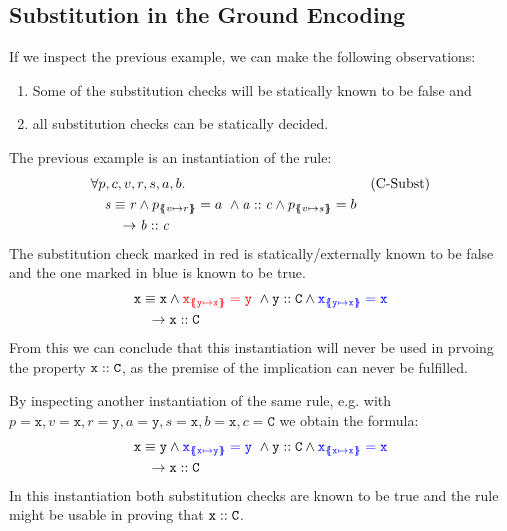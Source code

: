 \documentclass[a4paper]{article}
\begin{document}
\subsection{Substitution in the Ground Encoding}
If we inspect the previous example,
we can make the following observations:
\begin{enumerate}
  \item Some of the substitution checks will be statically known to be false and
  \item all substitution checks can be statically decided.
\end{enumerate}

The previous example is an instantiation of the rule:
\begin{align*}
  &\forall p, c, v, r, s, a, b. && \text{(C-Subst)}\\
  &\quad \mathit{s} \equiv \mathit{r} \land p_{\{\mskip-6.9mu\{ v \mapsto r \}\mskip-6.9mu\}}=a~\land
         \mathit{a} :: \mathit{c} \land
         p_{\{\mskip-6.9mu\{ v \mapsto s \}\mskip-6.9mu\}}=b\\
  &\qquad \rightarrow \mathit{b} :: \mathit{c}
\end{align*}
The substitution check marked in red is statically/externally known to be false
and the one marked in blue is known to be true.
%
\begin{align*}
  &\mathit{\mathtt{x}} \equiv \mathit{\mathtt{x}} \land {\color{red}\ensuremath{\mathtt{x}_{\{\mskip-6.9mu\{ \mathtt{y} \mapsto \mathtt{x} \}\mskip-6.9mu\}}}=\mathtt{y}}~\land
  \mathit{\mathtt{y}} :: \mathit{\mathtt{C}} \land {\color{blue}\ensuremath{\mathtt{x}_{\{\mskip-6.9mu\{ \mathtt{y} \mapsto \mathtt{x} \}\mskip-6.9mu\}}}=\mathtt{x}}\\
  &\quad \rightarrow \mathit{\mathtt{x}} :: \mathit{\mathtt{C}}
\end{align*}
%
From this we can conclude that this instantiation will never be used
in prvoing the property $\mathit{\mathtt{x}} :: \mathit{\mathtt{C}}$,
as the premise of the implication can never be fulfilled.

By inspecting another instantiation of the same rule,
e.g. with
$p=\mathtt{x}, v=\mathtt{x}, r=\mathtt{y}, a=\mathtt{y}, s=\mathtt{x}, b=\mathtt{x}, c=\mathtt{C}$
we obtain the formula:
\begin{align*}
  &\mathit{\mathtt{x}} \equiv \mathit{\mathtt{y}} \land
   {\color{blue}\ensuremath{\mathtt{x}_{\{\mskip-6.9mu\{ \mathtt{x} \mapsto \mathtt{y} \}\mskip-6.9mu\}}}=\mathtt{y}}~\land
   \mathit{\mathtt{y}} :: \mathit{\mathtt{C}} \land
   {\color{blue}\ensuremath{\mathtt{x}_{\{\mskip-6.9mu\{ \mathtt{x} \mapsto \mathtt{x} \}\mskip-6.9mu\}}}=\mathtt{x}}\\
  &\quad \rightarrow \mathit{\mathtt{x}} :: \mathit{\mathtt{C}}
\end{align*}
In this instantiation both substitution checks are known to be true
and the rule might be usable in proving that $\mathit{\mathtt{x}} :: \mathit{\mathtt{C}}$.
\end{document}
